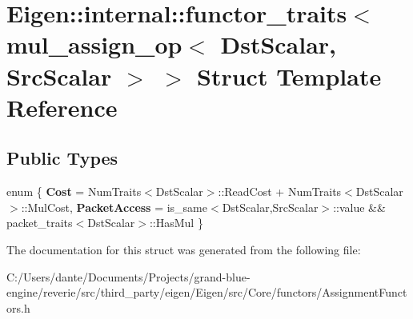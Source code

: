 \hypertarget{struct_eigen_1_1internal_1_1functor__traits_3_01mul__assign__op_3_01_dst_scalar_00_01_src_scalar_01_4_01_4}{}\section{Eigen\+::internal\+::functor\+\_\+traits$<$ mul\+\_\+assign\+\_\+op$<$ Dst\+Scalar, Src\+Scalar $>$ $>$ Struct Template Reference}
\label{struct_eigen_1_1internal_1_1functor__traits_3_01mul__assign__op_3_01_dst_scalar_00_01_src_scalar_01_4_01_4}
\subsection*{Public Types}
\begin{DoxyCompactItemize}
\item 
\mbox{\label{struct_eigen_1_1internal_1_1functor__traits_3_01mul__assign__op_3_01_dst_scalar_00_01_src_scalar_01_4_01_4_aef5585f505c89c9ba5c9865752eb164a}} 
enum \{ {\bfseries Cost} = Num\+Traits$<$Dst\+Scalar$>$\+::Read\+Cost + Num\+Traits$<$Dst\+Scalar$>$\+::Mul\+Cost, 
{\bfseries Packet\+Access} = is\+\_\+same$<$Dst\+Scalar,Src\+Scalar$>$\+::value \&\& packet\+\_\+traits$<$Dst\+Scalar$>$\+::Has\+Mul
 \}
\end{DoxyCompactItemize}


The documentation for this struct was generated from the following file\+:\begin{DoxyCompactItemize}
\item 
C\+:/\+Users/dante/\+Documents/\+Projects/grand-\/blue-\/engine/reverie/src/third\+\_\+party/eigen/\+Eigen/src/\+Core/functors/Assignment\+Functors.\+h\end{DoxyCompactItemize}
